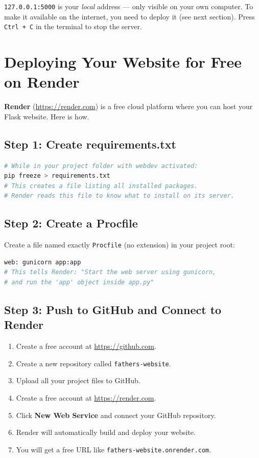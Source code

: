 \documentclass[12pt, a4paper]{book}
\begin{document}
\begin{tcolorbox}[tipbox]
\texttt{127.0.0.1:5000} is your \emph{local} address --- only visible on your own computer.
To make it available on the internet, you need to deploy it (see next section).
Press \texttt{Ctrl + C} in the terminal to stop the server.
\end{tcolorbox}

\section{Deploying Your Website for Free on Render}

\textbf{Render} (\url{https://render.com}) is a free cloud platform where you can
host your Flask website. Here is how.

\subsection{Step 1: Create requirements.txt}

\begin{lstlisting}[language=bash, style=bashstyle, caption={Generate requirements.txt}]
# While in your project folder with webdev activated:
pip freeze > requirements.txt
# This creates a file listing all installed packages.
# Render reads this file to know what to install on its server.
\end{lstlisting}

\subsection{Step 2: Create a Procfile}

Create a file named exactly \texttt{Procfile} (no extension) in your project root:

\begin{lstlisting}[language=bash, style=bashstyle, caption={Procfile content}]
web: gunicorn app:app
# This tells Render: "Start the web server using gunicorn,
# and run the 'app' object inside app.py"
\end{lstlisting}

\subsection{Step 3: Push to GitHub and Connect to Render}

\begin{enumerate}[leftmargin=1.5em]
  \item Create a free account at \url{https://github.com}.
  \item Create a new repository called \texttt{fathers-website}.
  \item Upload all your project files to GitHub.
  \item Create a free account at \url{https://render.com}.
  \item Click \textbf{New Web Service} and connect your GitHub repository.
  \item Render will automatically build and deploy your website.
  \item You will get a free URL like \texttt{fathers-website.onrender.com}.
\end{enumerate}
\end{document}

